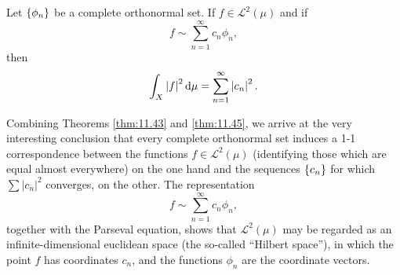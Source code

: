 \begin{thm}
    \label{thm:11.45}
    Let $\protect\{\phi_n\}$ be a complete orthonormal set.
    If $f \in \mathscr{L}^2(\mu)$ and if
    \begin{equation}
        \label{eq:11.106}
        f \sim \sum_{n=1}^{\infty} c_n \phi_n,
    \end{equation}
    then
    \begin{equation}
        \label{eq:11.107}
        \int_X \left| f \right|^2 \d \mu =
        \sum_{n=1}^{\infty} \left| c_n \right|^2 .
    \end{equation}
\end{thm}


Combining Theorems \ref{thm:11.43} and \ref{thm:11.45}, we arrive at the very interesting
conclusion that every complete orthonormal set induces a 1-1 correspondence
between the functions $f \in \mathscr{L}^2(\mu)$
(identifying those which are equal almost everywhere)
on the one hand and the sequences $\protect\{c_n\}$ for which $\sum \left| c_n \right|^2$ converges,
on the other. The representation
\begin{equation*}
    f \sim \sum_{n=1}^{\infty} c_n \phi_n ,
\end{equation*}
together with the Parseval equation, shows that $\mathscr{L}^2(\mu)$ may be regarded as an
infinite-dimensional euclidean space (the so-called ``Hilbert space''), in which
the point $f$ has coordinates $c_n$, and the functions $\phi_n$ are the coordinate vectors.